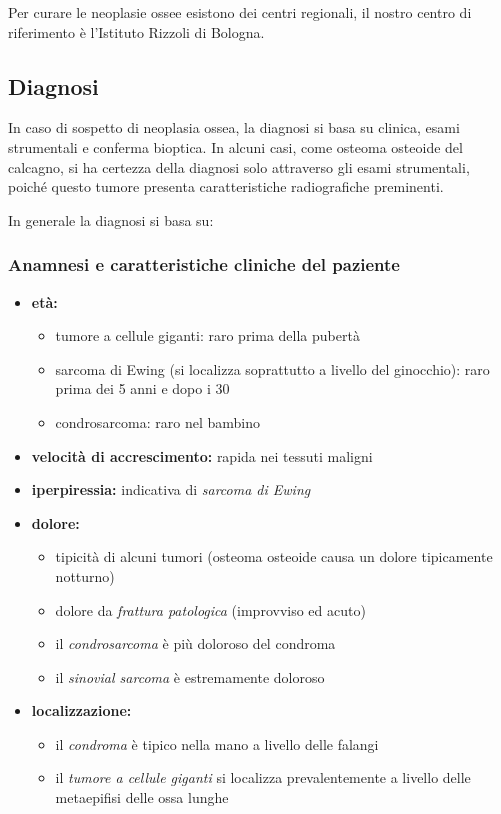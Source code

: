 Per curare le neoplasie ossee esistono dei centri regionali, il nostro centro di riferimento è l'Istituto Rizzoli di Bologna.

\subsection{Diagnosi}

In caso di sospetto di neoplasia ossea, la diagnosi si basa su clinica, esami strumentali e conferma bioptica. In alcuni casi, come osteoma osteoide del calcagno, si ha certezza della diagnosi solo attraverso gli esami strumentali, poiché questo tumore presenta caratteristiche radiografiche preminenti.

In generale la diagnosi si basa su:

\subsubsection{Anamnesi e caratteristiche cliniche del paziente}

\begin{itemize}
\item \textbf{età:}
\begin{itemize}
\item tumore a cellule giganti: raro prima della pubertà
\item sarcoma di Ewing (si localizza soprattutto a livello del ginocchio): raro prima dei 5 anni e dopo i 30
\item condrosarcoma: raro nel bambino
\end{itemize}
\item \textbf{velocità di accrescimento:} rapida nei tessuti maligni
\item \textbf{iperpiressia:} indicativa di \emph{sarcoma di Ewing}
\item \textbf{dolore:}
\begin{itemize}
\item tipicità di alcuni tumori (osteoma osteoide causa un dolore tipicamente notturno)
\item dolore da \emph{frattura patologica} (improvviso ed acuto)
\item il \emph{condrosarcoma} è più doloroso del condroma
\item il \emph{sinovial sarcoma} è estremamente doloroso
\end{itemize}
\item \textbf{localizzazione:} 
\begin{itemize}
\item il \emph{condroma} è tipico nella mano a livello delle falangi
\item il \emph{tumore a cellule giganti} si localizza prevalentemente a livello delle metaepifisi delle ossa lunghe
\end{itemize}
\end{itemize}

